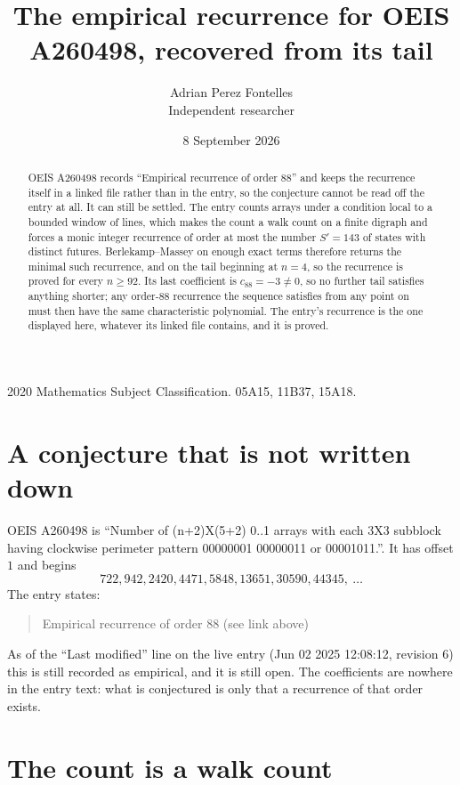 \documentclass[11pt,a4paper]{article}
\title{The empirical recurrence for OEIS A260498, recovered from its tail}
\author{Adrian Perez Fontelles\\ \small Independent researcher}
\date{8 September 2026}
\theoremstyle{plain}
\theoremstyle{definition}
\begin{document}
\maketitle

\begin{abstract}
OEIS A260498 records ``Empirical recurrence of order $88$'' and keeps the recurrence itself in
a linked file rather than in the entry, so the conjecture cannot be read off the entry at all.
It can still be settled. The entry counts arrays under a condition local to a bounded window of
lines, which makes the count a walk count on a finite digraph and forces a monic integer
recurrence of order at most the number $S'=143$ of states with distinct futures. Berlekamp--Massey on
enough exact terms therefore returns the minimal such recurrence, and on the tail beginning at $n=4$, so the recurrence is proved for every $n\ge92$.
Its last coefficient is $c_{88}=-3\neq0$, so no further tail satisfies anything
shorter; any order-$88$ recurrence the sequence satisfies from any point on must then have
the same characteristic polynomial. The entry's recurrence is the one displayed here, whatever
its linked file contains, and it is proved.
\end{abstract}

\noindent\small 2020 Mathematics Subject Classification. 05A15, 11B37, 15A18.\normalsize

\section{A conjecture that is not written down}

OEIS A260498 is ``Number of (n+2)X(5+2) 0..1 arrays with each 3X3 subblock having clockwise perimeter pattern 00000001 00000011 or 00001011.''. It has offset $1$ and begins
\[
722, 942, 2420, 4471, 5848, 13651, 30590, 44345,\ \dots
\]
The entry states:
\begin{quote}
Empirical recurrence of order 88 (see link above)
\end{quote}
As of the ``Last modified'' line on the live entry (Jun 02 2025 12:08:12, revision 6)
this is still recorded as empirical, and it is still open. The coefficients are nowhere in the
entry text: what is conjectured is only that a recurrence of that order exists.

\section{The count is a walk count}
\end{document}
